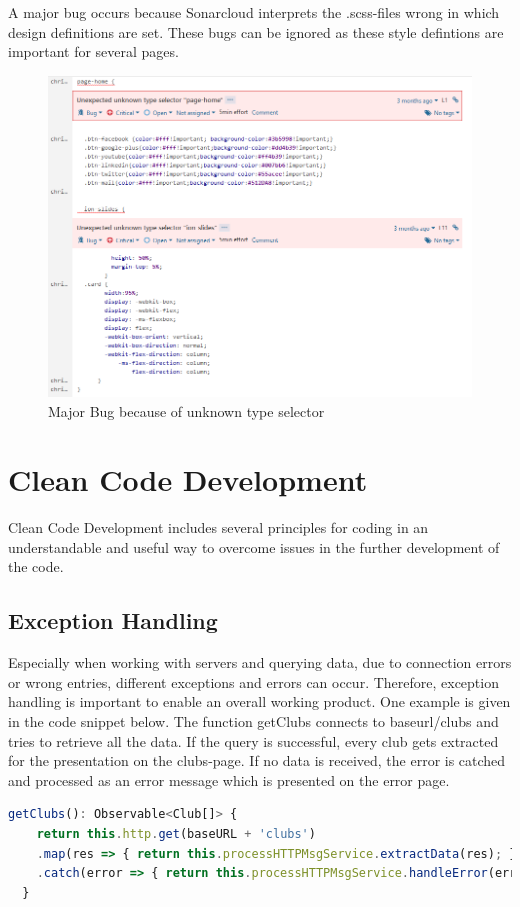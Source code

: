 \documentclass[12pt]{article}
\begin{document}
A major bug occurs because Sonarcloud interprets the .scss-files wrong in which design definitions are set. These bugs can be ignored as these style defintions are important for several pages.
\begin{figure}[H]
  \centering
    \includegraphics[width=1\textwidth]{figures/BugType.png}
    \caption{Major Bug because of unknown type selector}
\end{figure}

\newpage
\section{Clean Code Development}

Clean Code Development includes several principles for coding in an understandable and useful way to overcome issues in the further development of the code.

\subsection{Exception Handling}
Especially when working with servers and querying data, due to connection errors or wrong entries, different exceptions and errors can occur. Therefore, exception handling is important to enable an overall working product.
One example is given in the code snippet below. The function getClubs connects to baseurl/clubs and tries to retrieve all the data. If the query is successful, every club gets extracted for the presentation on the clubs-page. If no data is received, the error is catched and processed as an error message which is presented on the error page.
\begin{lstlisting}[language=javascript]
  getClubs(): Observable<Club[]> {
    return this.http.get(baseURL + 'clubs')
    .map(res => { return this.processHTTPMsgService.extractData(res); })
    .catch(error => { return this.processHTTPMsgService.handleError(error); });
  }
\end{lstlisting}
\end{document}
